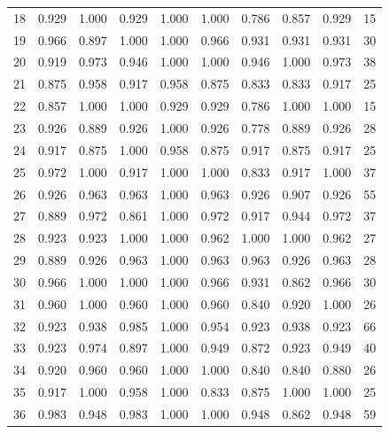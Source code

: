 \begin{table}[]
{\begin{tabular}{lrrrrrrrrr}
    18 &  0.929 & 1.000 & 0.929 &   1.000 &             1.000 & 0.786 & 0.857 & 0.929 &    15 \\
    19 &  0.966 & 0.897 & 1.000 &   1.000 &             0.966 & 0.931 & 0.931 & 0.931 &    30 \\
    20 &  0.919 & 0.973 & 0.946 &   1.000 &             1.000 & 0.946 & 1.000 & 0.973 &    38 \\
    21 &  0.875 & 0.958 & 0.917 &   0.958 &             0.875 & 0.833 & 0.833 & 0.917 &    25 \\
    22 &  0.857 & 1.000 & 1.000 &   0.929 &             0.929 & 0.786 & 1.000 & 1.000 &    15 \\
    23 &  0.926 & 0.889 & 0.926 &   1.000 &             0.926 & 0.778 & 0.889 & 0.926 &    28 \\
    24 &  0.917 & 0.875 & 1.000 &   0.958 &             0.875 & 0.917 & 0.875 & 0.917 &    25 \\
    25 &  0.972 & 1.000 & 0.917 &   1.000 &             1.000 & 0.833 & 0.917 & 1.000 &    37 \\
    26 &  0.926 & 0.963 & 0.963 &   1.000 &             0.963 & 0.926 & 0.907 & 0.926 &    55 \\
    27 &  0.889 & 0.972 & 0.861 &   1.000 &             0.972 & 0.917 & 0.944 & 0.972 &    37 \\
    28 &  0.923 & 0.923 & 1.000 &   1.000 &             0.962 & 1.000 & 1.000 & 0.962 &    27 \\
    29 &  0.889 & 0.926 & 0.963 &   1.000 &             0.963 & 0.963 & 0.926 & 0.963 &    28 \\
    30 &  0.966 & 1.000 & 1.000 &   1.000 &             0.966 & 0.931 & 0.862 & 0.966 &    30 \\
    31 &  0.960 & 1.000 & 0.960 &   1.000 &             0.960 & 0.840 & 0.920 & 1.000 &    26 \\
    32 &  0.923 & 0.938 & 0.985 &   1.000 &             0.954 & 0.923 & 0.938 & 0.923 &    66 \\
    33 &  0.923 & 0.974 & 0.897 &   1.000 &             0.949 & 0.872 & 0.923 & 0.949 &    40 \\
    34 &  0.920 & 0.960 & 0.960 &   1.000 &             1.000 & 0.840 & 0.840 & 0.880 &    26 \\
    35 &  0.917 & 1.000 & 0.958 &   1.000 &             0.833 & 0.875 & 1.000 & 1.000 &    25 \\
    36 &  0.983 & 0.948 & 0.983 &   1.000 &             1.000 & 0.948 & 0.862 & 0.948 &    59 \\

\end{tabular}}
\end{table}
